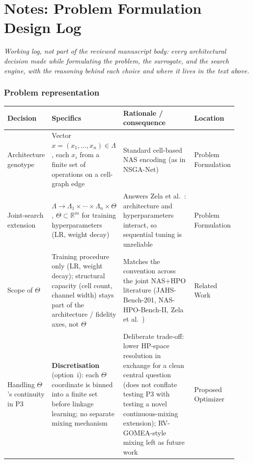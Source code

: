 \clearpage
\onecolumn

\section*{Notes: Problem Formulation Design Log}

\emph{Working log, not part of the reviewed manuscript body: every architectural decision made while
formulating the problem, the surrogate, and the search engine, with the reasoning behind each choice and
where it lives in the text above.}

\subsubsection*{Problem representation}
\begin{longtable}{p{0.16\linewidth} p{0.28\linewidth} p{0.36\linewidth} p{0.13\linewidth}}
\toprule
\textbf{Decision} & \textbf{Specifics} & \textbf{Rationale / consequence} & \textbf{Location} \\
\midrule
\endhead
Architecture genotype & Vector $x=(x_1,\dots,x_n)\in\Lambda$, each $x_i$ from a finite set of operations on a cell-graph edge & Standard cell-based NAS encoding (as in NSGA-Net) & Problem Formulation \\
Joint-search extension & $\Lambda \to \Lambda_1\times\cdots\times\Lambda_n\times\Theta$, $\Theta\subset\mathbb{R}^m$ for training hyperparameters (LR, weight decay) & Answers Zela et al.~\citep{zela2018towards}: architecture and hyperparameters interact, so sequential tuning is unreliable & Problem Formulation \\
Scope of $\Theta$ & Training procedure only (LR, weight decay); structural capacity (cell count, channel width) stays part of the architecture / fidelity axes, not $\Theta$ & Matches the convention across the joint NAS+HPO literature (JAHS-Bench-201, NAS-HPO-Bench-II, Zela et al.~\citep{zela2018towards}) & Related Work \\
Handling $\Theta$'s continuity in P3 & \textbf{Discretisation} (option~i): each $\Theta$ coordinate is binned into a finite set before linkage learning; no separate mixing mechanism & Deliberate trade-off: lower HP-space resolution in exchange for a clean central question (does not conflate testing P3 with testing a novel continuous-mixing extension); RV-GOMEA-style mixing left as future work & Proposed Optimizer \\

\end{longtable}
